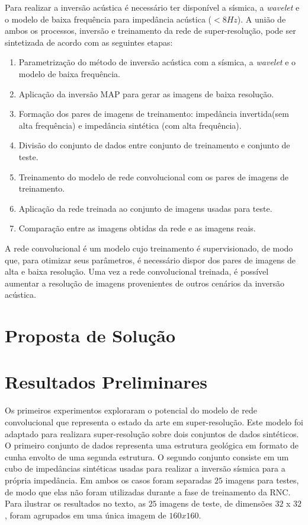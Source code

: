 Para realizar a inversão acústica é necessário ter disponível a sísmica, a \textit{wavelet}
e o modelo de baixa frequência para impedância acústica ($<8Hz$). %
A união de ambos os processos, inversão e treinamento da rede de super-resolução,
pode ser sintetizada de acordo com as seguintes etapas:
\begin{enumerate}
  \item Parametrização do método de inversão acústica com a sísmica, a \textit{wavelet} e o modelo de baixa frequência.
  \item Aplicação da inversão MAP para gerar as imagens de baixa resolução.
  \item Formação dos pares de imagens de treinamento: impedância invertida(sem alta frequência) e impedância sintética
  (com alta frequência).
  \item Divisão do conjunto de dados entre conjunto de treinamento e conjunto de teste.
  \item Treinamento do modelo de rede convolucional com os pares de imagens de treinamento.
  \item Aplicação da rede treinada ao conjunto de imagens usadas para teste.
  \item Comparação entre as imagens obtidas da rede e as imagens reais.
\end{enumerate}

A rede convolucional é um modelo cujo treinamento é supervisionado, de modo que,
para otimizar seus parâmetros, é necessário dispor dos pares de imagens de alta
e baixa resolução. Uma vez a rede convolucional treinada, é possível aumentar a
resolução de imagens provenientes de outros cenários da inversão acústica.

\section{Proposta de Solução}


\section{Resultados Preliminares}
Os primeiros experimentos exploraram o potencial do modelo de rede convolucional que representa
o estado da arte em super-resolução. Este modelo foi adaptado para realizara super-resolução
sobre dois conjuntos de dados sintéticos. O primeiro conjunto de dados representa uma estrutura
geológica em formato de cunha envolto de uma segunda estrutura.
O segundo conjunto consiste em um cubo de impedâncias sintéticas usadas para realizar a inversão
sísmica para a própria impedância. Em ambos os casos foram separadas $25$ imagens para testes,
de modo que elas não foram utilizadas durante a fase de treinamento da RNC. Para ilustrar os resultados
no texto, as $25$ imagens de teste, de dimensões $32$ x $32$, foram agrupados em uma única imagem de $160 x 160$. 


